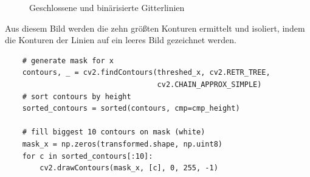 \begin{figure}[H]
    \hfill
    \caption{Geschlossene und binärisierte Gitterlinien}
\end{figure}

Aus diesem Bild werden die zehn größten Konturen ermittelt und isoliert, indem die Konturen der Linien auf ein leeres Bild gezeichnet werden.

\begin{lstlisting}
    # generate mask for x
    contours, _ = cv2.findContours(threshed_x, cv2.RETR_TREE,
                                   cv2.CHAIN_APPROX_SIMPLE)
    # sort contours by height
    sorted_contours = sorted(contours, cmp=cmp_height)

    # fill biggest 10 contours on mask (white)
    mask_x = np.zeros(transformed.shape, np.uint8)
    for c in sorted_contours[:10]:
        cv2.drawContours(mask_x, [c], 0, 255, -1)
\end{lstlisting}


